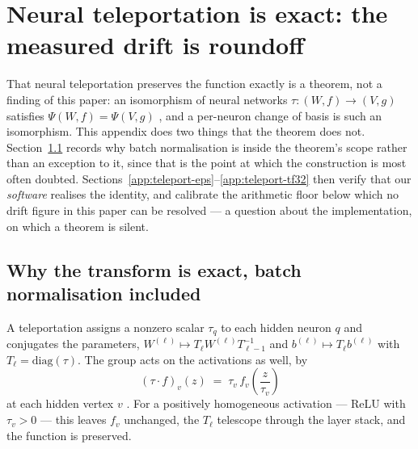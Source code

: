 %

\section{Neural teleportation is exact: the measured drift is roundoff}
\label{app:teleport-exact}

That neural teleportation preserves the function exactly is a theorem, not a
finding of this paper: an isomorphism of neural networks $\tau:(W,f)\to(V,g)$
satisfies $\Psi(W,f)=\Psi(V,g)$ \citep[Thm.~4.13]{armenta2021representation}, and
a per-neuron change of basis is such an isomorphism. This appendix does two
things that the theorem does not. Section~\ref{app:teleport-why} records why
batch normalisation is inside the theorem's scope rather than an exception to it,
since that is the point at which the construction is most often doubted.
Sections~\ref{app:teleport-eps}--\ref{app:teleport-tf32} then verify that our
\emph{software} realises the identity, and calibrate the arithmetic floor below
which no drift figure in this paper can be resolved --- a question about the
implementation, on which a theorem is silent.

\subsection{Why the transform is exact, batch normalisation included}
\label{app:teleport-why}

A teleportation assigns a nonzero scalar $\tau_q$ to each hidden neuron $q$ and
conjugates the parameters, $W^{(\ell)}\mapsto T_\ell W^{(\ell)}T_{\ell-1}^{-1}$
and $b^{(\ell)}\mapsto T_\ell b^{(\ell)}$ with $T_\ell=\mathrm{diag}(\tau)$. The
group acts on the activations as well, by
\begin{equation}
(\tau\cdot f)_v(z)\;=\;\tau_v\,f_v\!\left(\frac{z}{\tau_v}\right)
\label{eq:cob-activation}
\end{equation}
at each hidden vertex $v$ \citep[Eq.~2]{armenta2021representation}. For a
positively homogeneous activation --- ReLU with $\tau_v>0$ --- this leaves $f_v$
unchanged, the $T_\ell$ telescope through the layer stack, and the function is
preserved.

